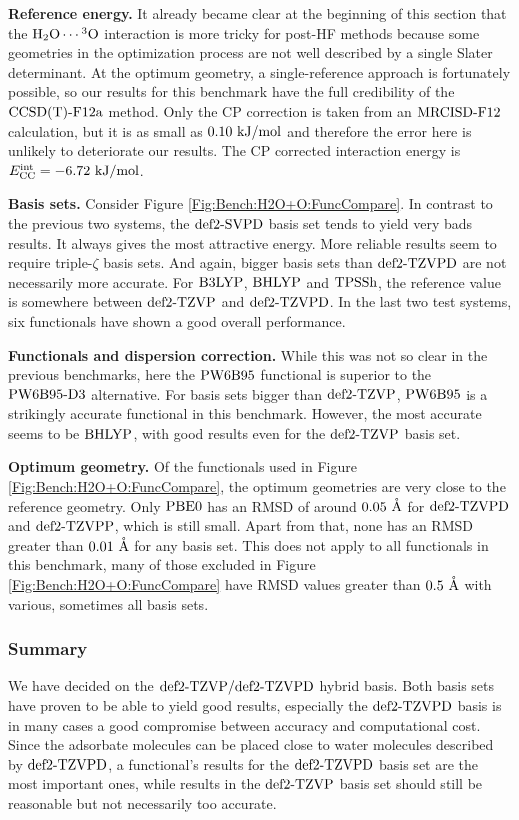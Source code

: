 \textbf{Reference energy.} It already became clear at the beginning of this
section that the $\mbox{\ensuremath{\text H _2 \text O \cdots \hspace{.2pt} ^3\text{O}}}$ interaction is more tricky for post-HF methods because
some geometries in the optimization process are not well described by a single
Slater determinant. At the optimum geometry, a single-reference approach is
fortunately possible, so our results for this benchmark have the full
credibility of the $\text{CCSD(T)-F12a}$ method. Only the CP correction is taken from an
$\text{MRCISD-F12}$ calculation, but it is as small as \mbox{$0.10\ \text {kJ/mol}$} and therefore
the error here is unlikely to deteriorate our results. The CP corrected
interaction energy is \mbox{$\ecc=-6.72\ \kmo$}.


\textbf{Basis sets.} Consider Figure \ref{Fig:Bench:H2O+O:FuncCompare}. In
contrast to the previous two systems, the $\text{def2-SVPD}$ basis set tends to yield very
bads results. It always gives the most attractive energy. More reliable results
seem to require triple-$\zeta$ basis sets. And again, bigger basis sets than
$\text{def2-TZVPD}$ are not necessarily more accurate. For $\text{B3LYP}$, $\text{BHLYP}$ and
$\text{TPSSh}$, the reference value is somewhere between $\text{def2-TZVP}$ and $\text{def2-TZVPD}$.
In the last two test systems, six functionals have shown a good overall
performance.

\textbf{Functionals and dispersion correction.}
While this was not so clear in the previous benchmarks, here the $\text{PW6B95}$
functional is superior to the $\text{PW6B95}\text{-D3}$ alternative. For basis sets
bigger than $\text{def2-TZVP}$, $\text{PW6B95}$ is a strikingly accurate functional in this benchmark.
However, the most accurate seems to be $\text{BHLYP}$, with good results even for
the $\text{def2-TZVP}$ basis set.

\textbf{Optimum geometry.} Of the functionals used in Figure
\ref{Fig:Bench:H2O+O:FuncCompare}, the optimum geometries are very close to the
reference geometry. Only $\text{PBE0}$ has an RMSD of around $0.05~\mathring{\text{A}}$ for
$\text{def2-TZVPD}$ and $\text{def2-TZVPP}$, which is still small. Apart from that, none has an RMSD
greater than $0.01\ \Ang$ for any basis set. This
does not apply to all functionals in this benchmark, many of those excluded
in Figure \ref{Fig:Bench:H2O+O:FuncCompare} have RMSD values greater than $0.5\
\mathring{\text{A}}$ with various, sometimes all basis sets.

\subsubsection{Summary}

We have decided on the $\text{def2-TZVP}/\text{def2-TZVPD}$ hybrid basis. Both basis sets
have proven to be able to yield good results, especially the $\text{def2-TZVPD}$ basis
is in many cases a good compromise between accuracy and computational cost.
Since the adsorbate molecules can be placed close to water molecules described
by $\text{def2-TZVPD}$, a functional's results for the $\text{def2-TZVPD}$ basis set are the most
important ones, while results in the $\text{def2-TZVP}$ basis set should still be
reasonable but not necessarily too accurate.

